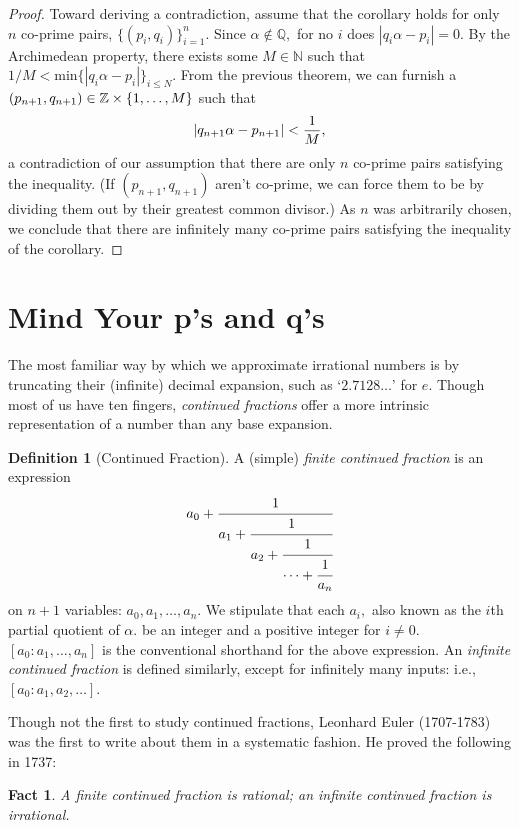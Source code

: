 \documentclass[12pt, letterpaper, oneside]{book}
\newcommand{\ga}{\ensuremath{\alpha}}
\newcommand{\Q}{\mathbb{Q}}
\newcommand{\N}{\mathbb{N}}
\newcommand{\Z}{\mathbb{Z}}
\DeclarePairedDelimiter{\abs}{\lvert}{\rvert}
\DeclarePairedDelimiter{\set}{\lbrace}{\rbrace}
\theoremstyle{plain}
\newtheorem{fact}{Fact}
\theoremstyle{definition}
\newtheorem{definition}{Definition}
\theoremstyle{remark}
\begin{document}
\begin{proof}
  Toward deriving a contradiction, assume that the corollary holds for
  only $n$ co-prime pairs, $\{(p_i, q_i)\}^{n}_{i=1}$. Since $\ga \notin \Q,$ for no $i$ does $|q_i\ga-p_i|=0$. 
  By the Archimedean property, there exists some $M \in \N$ such that
  $ 1/M < \mbox{min}\{|q_i\ga - p_i|\}_{i\leq N}$. From the previous
  theorem, we can furnish a $(p_{n+1},q_{n+1})\in \Z \times \set{1,\ldots,M}$ such that
  \[
  \abs{q_{n+1}\ga - p_{n+1}}<\frac{1}{M},
  \]
  a contradiction of our assumption that there are only $n$ co-prime
  pairs satisfying the inequality. (If $(p_{n+1},q_{n+1})$ aren't co-prime, we can force them to be by
  dividing them out by their greatest common divisor.) As $n$ was arbitrarily chosen, we
  conclude that there are infinitely many co-prime pairs satisfying the inequality of the corollary.
\end{proof}

\section{Mind Your p's and q's}

The most familiar way by which we approximate irrational numbers is by
truncating their (infinite) decimal expansion, such as `$2.7128\ldots$' for $e$. Though most of us have ten fingers, \textit{continued fractions} offer a more intrinsic representation of a number than any base expansion. 

\begin{definition}[Continued Fraction]
  A (simple) \textit{finite continued fraction} is an expression
  \[
  a_0 + \cfrac{1}{a_1 + \cfrac{1}{a_2+\cfrac{1}{\cdots +
          \cfrac{1}{a_n}}}}
  \]
  on $n+1$ variables: $a_0,a_1,\ldots,a_n$. We stipulate that each $a_i,$ also known as the $i$th partial quotient of $\ga.$ 
  be an integer and a positive integer for $i\neq0$. $[a_0:a_1,\ldots,a_n]$ is the conventional shorthand for the above expression. An
  \textit{infinite continued fraction} is defined
  similarly, except for infinitely many inputs: i.e.,
  $[a_0:a_1,a_2,\ldots]$.
\end{definition}

Though not the first to study continued fractions, Leonhard Euler
(1707-1783) was the first to write about them in a systematic
fashion. He proved the following in 1737:

\begin{fact}
  A finite continued fraction is rational; an infinite continued
  fraction is irrational.
\end{fact}
\end{document}
